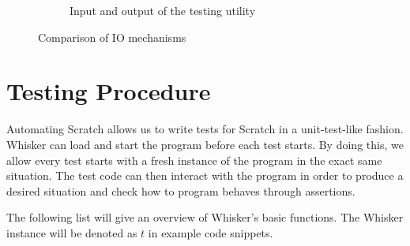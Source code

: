 \begin{figure}[h]
\begin{subfigure}[b]{\textwidth}
        \caption{Input and output of the testing utility}
        \label{fig:input_and_output_of_the_testing utility}
    \end{subfigure}

    \caption{Comparison of IO mechanisms}
    \label{fig:comparison_of_io_mechanisms}
\end{figure}

\section{Testing Procedure}

Automating Scratch allows us to write tests for Scratch in a unit-test-like fashion.
Whisker can load and start the program before each test starts.
By doing this, we allow every test starts with a fresh instance of the program in the exact same situation.
The test code can then interact with the program in order to produce a desired situation and check how to program behaves through assertions.

The following list will give an overview of Whisker's basic functions.
The Whisker instance will be denoted as $t$ in example code snippets.

